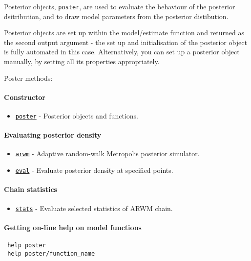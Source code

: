 

	Posterior objects, \texttt{poster}, are used to evaluate the behaviour
 of the posterior dsitribution, and to draw model parameters from the
 posterior distibution.
 
 Posterior objects are set up within the \url{model/estimate} function
 and returned as the second output argument - the set up and
 initialisation of the posterior object is fully automated in this case.
 Alternatively, you can set up a posterior object manually, by setting
 all its properties appropriately.
 
 Poster methods:
 
 \paragraph{Constructor}
 
 \begin{itemize}
 \item
   \href{poster/poster}{\texttt{poster}} - Posterior objects and
   functions.
 \end{itemize}
 
 \paragraph{Evaluating posterior density}
 
 \begin{itemize}
 \item
   \href{poster/arwm}{\texttt{arwm}} - Adaptive random-walk Metropolis
   posterior simulator.
 \item
   \href{poster/eval}{\texttt{eval}} - Evaluate posterior density at
   specified points.
 \end{itemize}
 
 \paragraph{Chain statistics}
 
 \begin{itemize}
 \item
   \href{poster/stats}{\texttt{stats}} - Evaluate selected statistics of
   ARWM chain.
 \end{itemize}
 
 \paragraph{Getting on-line help on model functions}
 
 \begin{verbatim}
 help poster
 help poster/function_name
 \end{verbatim}



